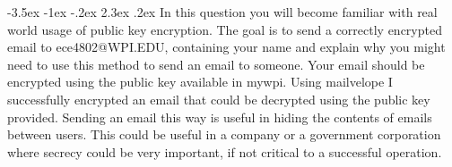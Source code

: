 \documentclass{article}
\makeatletter
\renewcommand\section{\@startsection{section}{1}{\z@}%
                                   {-3.5ex \@plus -1ex \@minus -.2ex}%
                                   {2.3ex \@plus.2ex}%
                                   {\normalfont\large\bfseries}}
\makeatother
\begin{document}
	\section{In this question you will become familiar with real world usage of public key encryption. The goal is to send a correctly encrypted email to ece4802@WPI.EDU, containing your name and explain why you might need to use this method to send an email to someone. Your email should be encrypted using the public key available in mywpi.}
	Using mailvelope I successfully encrypted an email that could be decrypted using the public key provided. Sending an email this way is useful in hiding the contents of emails between users. This could be useful in a company or a government corporation where secrecy could be very important, if not critical to a successful operation.
\end{document}
